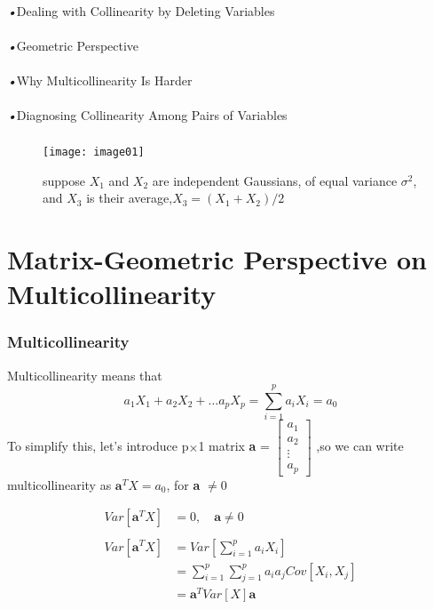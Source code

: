 \documentclass{beamer}
\begin{document}
 
 
    \begin{frame}
      \frametitle{}
      \emph{•}Dealing with Collinearity by Deleting Variables
      \\\mbox{}
      \\\emph{•}Geometric Perspective
      \\\mbox{}
      \\\emph{•}Why Multicollinearity Is Harder
      \\\mbox{}
      \\\emph{•}Diagnosing Collinearity Among Pairs of Variables
    \end{frame}
    
    \begin{frame}
    \frametitle{}
    \begin{figure}[h]
	\begin{center}
		\texttt{[image: image01]}
	\end{center}
	\caption{suppose $X_1$ and $X_2$ are independent Gaussians, of equal variance $\sigma^2$, and $X_3$ is their average,$X_3 = \left( X_1 + X_2 \right)/ 2$}
    \end{figure}
    \end{frame}
    
    
\section{Matrix-Geometric Perspective on Multicollinearity}
    \begin{frame}
    \frametitle{Multicollinearity}
    Multicollinearity means that
    \begin{equation*}
    	a_1X_1+a_2X_2+\hdots  a_pX_p=\sum_{i=1}^{p}a_iX_i=a_0
    \end{equation*}
    To simplify this, let's introduce p$\times$1 matrix
    \textbf{a} = $\begin{bmatrix}
	a_1
	\\a_2
	\\\vdots 
	\\a_p
    \end{bmatrix}$
    ,so we can write multicollinearity as    $\textbf{a}^{T} X = a_0$, for \textbf{a} $ \neq 0$
    \end{frame}
   
	\begin{frame}
	\begin{equation*}
	\begin{aligned}
	Var\left[ \textbf{a}^{T} X\right] &= 0,\quad \textbf{a} \neq 0
	\\\mbox{}
	\\Var\left[ \textbf{a}^{T} X\right] &= Var\left[ \sum_{i=1}^{p} a_i X_i\right]
	\\&=\sum_{i=1}^{p}\sum_{j=1}^{p}a_ia_j Cov\left[ X_i, X_j\right] 
	\\&=\textbf{a}^{T} Var\left[ X\right] \textbf{a}
	\end{aligned}
	\end{equation*}
    \end{frame}
	
\end{document}
